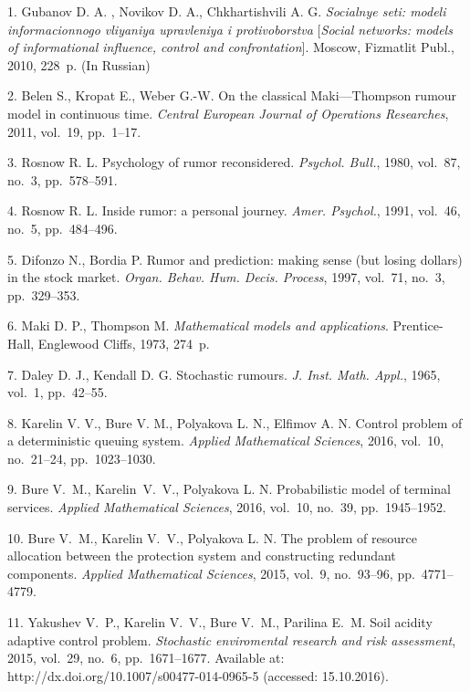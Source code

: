 

{\footnotesize

\vskip 4mm


\vskip 4mm

1. Gubanov D. A. ,  Novikov D. A.,  Chkhartishvili A. G. {\it
Socialnye seti: modeli informacionnogo vliyaniya upravleniya i
protivoborstva} [{\it Social networks: models of informational
influence, control and confrontation}]. Moscow, Fizmatlit Publ.,
2010, 228~p. (In Russian)

2. Belen S., Kropat E.,   Weber G.-W.    On the classical
Maki---Thompson rumour model  in continuous time. {\it  Central
European Journal of Operations Researches}, 2011, vol.~19,
pp.~1--17.

3. Rosnow  R. L.  Psychology of rumor reconsidered. {\it Psychol.
Bull.}, 1980, vol.~87, no.~3, pp.~578--591.

4. Rosnow  R. L. Inside rumor: a personal journey. {\it Amer.
Psychol.}, 1991,   vol.~46, no.~5, pp.~484--496.

5. Difonzo  N.,  Bordia  P.  Rumor and prediction:  making sense
(but losing dollars) in the stock market. {\it Organ. Behav. Hum.
Decis. Process}, 1997, vol.~71, no.~3, pp.~329--353.

6. Maki D. P., Thompson M. {\it  Mathematical models and
applications}. Prentice-Hall, Englewood Cliffs, 1973, 274~p.

7. Daley  D. J., Kendall D. G. Stochastic rumours. {\it J. Inst.
Math. Appl.},  1965, vol.~1, pp.~42--55.

8. Karelin V. V., Bure V. M., Polyakova L. N., Elfimov A. N.
Control problem of a deterministic queuing system. {\it Applied
Mathematical Sciences}, 2016, vol.~10, no.~21--24, pp.~1023--1030.

9. Bure V.~M., Karelin~V.~V.,  Polyakova L. N. Probabilistic model
of terminal services. {\it Applied Mathematical Sciences}, 2016,
vol.~10,  no.~39, pp.~1945--1952.

10. Bure V.~M., Karelin V.~V., Polyakova L. N. The problem of
resource allocation between the protection system and constructing
redundant components. {\it  Applied Mathematical Sciences}, 2015,
vol.~9, no.~93--96, pp.~4771--4779.

11. Yakushev V.~P., Karelin V.~V., Bure V.~M., Parilina E.~M. Soil
acidity adaptive control problem. {\it Stochastic enviromental
research and risk assessment}, 2015, vol.~29, no.~6,
pp.~1671--1677. Available at:
http://dx.doi.org/10.1007/s00477-014-0965-5 (accessed:
15.10.2016).

}
